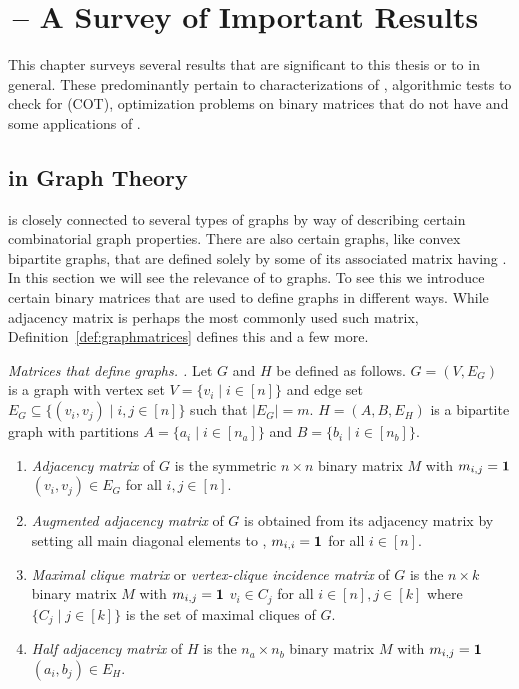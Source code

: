 \def\tblhcolor {gray}


\chapter{\CoP\,-- A Survey of Important Results}
\label{ch:copsurvey}

This chapter surveys several results that are significant to this
thesis or to \COP in general. These predominantly pertain to
characterizations of \COP, algorithmic tests to check for \COP (COT),
optimization problems on binary matrices that do not have \COP and
some applications of \COP.




\section{\COP in Graph Theory}

\COP is closely connected to several types of graphs by way of
describing certain combinatorial graph properties. There are also
certain graphs, like convex bipartite graphs, that are defined solely
by some of its associated matrix having \COP.  In this section we will
see the relevance of \cop to graphs.  To see this we introduce certain
binary matrices that are used to define graphs in different
ways. While adjacency matrix is perhaps the most commonly used such
matrix, Definition~\ref{def:graphmatrices} defines this and a few
more.

\begin{definition}
  {\em Matrices that define graphs. \cite[Def.~2.4]{d08phd}.}  
  \label{def:graphmatrices} 
  Let $G$ and $H$ be defined as follows. $G = (V,E_G)$ is a graph with
  vertex set $V = \{v_i \mid i \in [n]\}$ and edge set $E_G \subseteq
  \{(v_i,v_j) \mid i, j \in [n]\}$ such that $|E_G| = m$. $H = (A, B,
  E_H)$ is a bipartite graph with partitions $A = \{a_i \mid i \in
  [n_a]\}$ and $B = \{b_i \mid i \in [n_b]\}$.
  \begin{enumerate}
  \item \emph{Adjacency matrix} of $G$ is the symmetric $n \times n$
    binary matrix $M$ with $m_{i,j} = \textbf{1}$ \iff $(v_i,v_j) \in E_G$
    for all $i,j \in [n]$.
  \item \emph{Augmented adjacency matrix} of $G$ is obtained from its
    adjacency matrix by setting all main diagonal elements to \un, \ie
    $m_{i,i} = \textbf{1}$ for all $i \in [n]$.
  \item \emph{Maximal clique matrix} or \emph{vertex-clique incidence
      matrix} of $G$ is the $n \times k$ binary matrix $M$ with
    $m_{i,j} = \textbf{1}$ \iff $v_i \in C_j$ for all $i \in [n], j \in [k]$
    where $\{C_j \mid j \in [k]\}$ is the set of maximal cliques of
    $G$.
    \label{def::maxcliquematrix}
  \item \emph{Half adjacency matrix} of $H$ is the $n_a \times n_b$
    binary matrix $M$ with $m_{i,j} = \textbf{1}$ \iff $(a_i, b_j) \in E_H$.
  \end{enumerate}
\end{definition}

